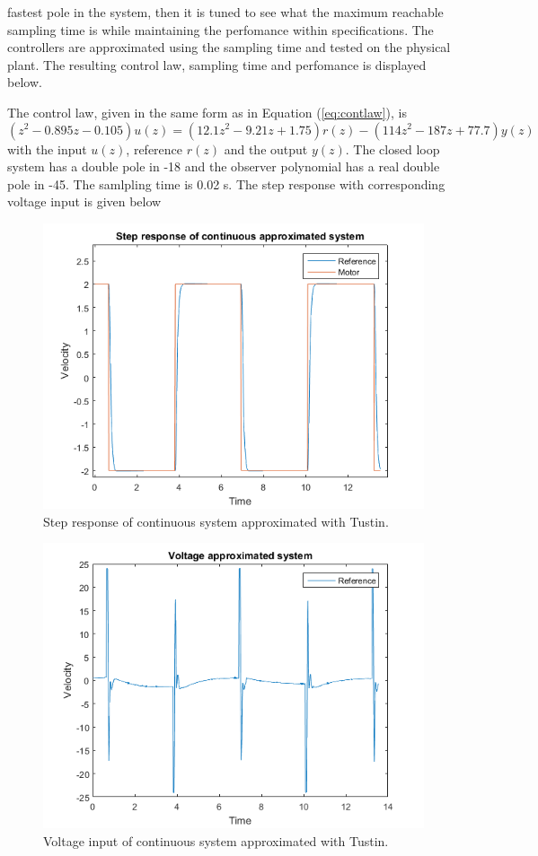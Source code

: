 \documentclass[12pt,a4paper]{article}
\begin{document}
fastest pole in the system, then it is tuned to see what the maximum reachable
sampling time is while maintaining the perfomance within specifications. The
controllers are approximated using the sampling time and tested on the physical
plant. The resulting control law, sampling time and perfomance is displayed
below. \par The control law, given  in the same form as in Equation
(\ref{eq:contlaw}), is
\begin{equation}
    \label{eq:pos_controllaw}
    (z^2 - 0.895z - 0.105) u(z) = (12.1z^2 - 9.21z + 1.75)r(z) - (114z^2 - 187z
    + 77.7)y(z)
\end{equation}
with the input $u(z)$, reference $r(z)$ and the output $y(z)$. The closed loop
system has a double pole in -18 and the observer polynomial has a real double
pole in -45. The samlpling time is 0.02 s. The step response with corresponding
voltage input is given below
\begin{figure}[H]
    \centering
    \includegraphics[width=0.8\linewidth]{continuous_level2.png}
    \caption{Step response of continuous system approximated with Tustin.}
    \label{fig:continuous_level2}
\end{figure}
\begin{figure}[H]
    \centering
    \includegraphics[width=0.8\linewidth]{continuous_level2_voltage.png}
    \caption{Voltage input of continuous system approximated with Tustin.}
    \label{fig:continuous_level2_voltage}
\end{figure}
\end{document}
